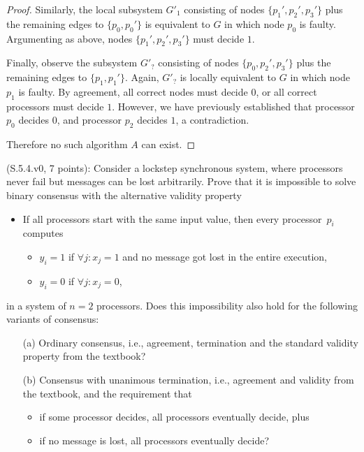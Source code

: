 \begin{proof}
Similarly, the local subsystem $G'_1$ consisting of nodes $\{p_1', p_2', p_3'\}$
plus the remaining edges to $\{p_0, p_0'\}$ is equivalent to $G$ in which node
$p_0$ is faulty. Argumenting as above, nodes $\{p_1', p_2', p_3'\}$ must decide $1$.

Finally, observe the subsystem $G'_?$ consisting of nodes $\{p_0, p_2', p_3'\}$
plus the remaining edges to $\{p_1, p_1'\}$. Again, $G'_?$ is locally equivalent
to $G$ in which node $p_1$ is faulty. By agreement, all correct nodes must decide
$0$, or all correct processors must decide $1$.
However, we have previously established that processor $p_0$ decides $0$,
and processor $p_2$ decides $1$, a contradiction.

Therefore no such algorithm $A$ can exist.
\end{proof}


\begin{Exc}{(S.5.4.v0, 7 points):}
Consider a lockstep synchronous system, where processors never fail but
messages can be lost arbitrarily. Prove that it is impossible to solve
binary consensus with the alternative validity property
\begin{itemize}
\item If all processors start with the same
input value, then every processor~$p_i$ computes
\begin{itemize}
\item $y_i=1$ if $\forall j: x_j=1$ and no message got
lost in the entire execution,
\item $y_i=0$ if $\forall j: x_j=0$,
\end{itemize}
\end{itemize}
in a system of $n=2$ processors. Does this impossibility also
hold for the following variants of consensus:
\begin{enumerate}
\item[(a)] Ordinary consensus, i.e., agreement, termination and
the standard validity property from the textbook?
\item[(b)] Consensus with unanimous termination, i.e., agreement and
validity from the textbook, and the requirement that
\begin{itemize}
\item if some processor decides, all processors eventually decide, plus
\item if no message is lost, all processors eventually decide?
\end{itemize}
\end{enumerate}
\end{Exc}

